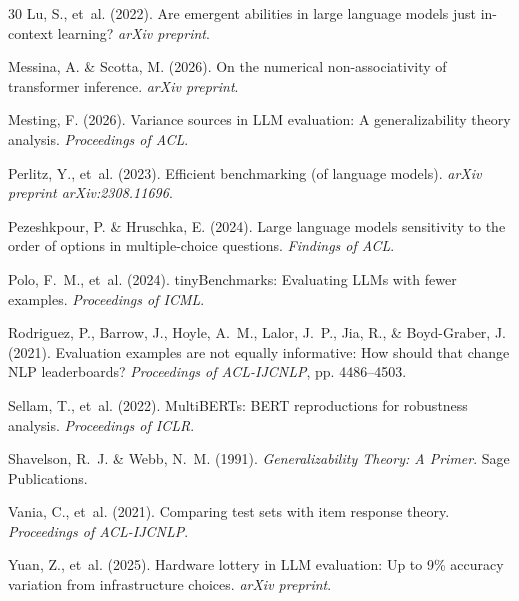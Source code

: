 \documentclass[11pt,twocolumn]{article}
\begin{document}
\begin{thebibliography}{30}
Lu, S., et~al. (2022).
\newblock Are emergent abilities in large language models just in-context learning?
\newblock \emph{arXiv preprint}.

Messina, A. \& Scotta, M. (2026).
\newblock On the numerical non-associativity of transformer inference.
\newblock \emph{arXiv preprint}.

Mesting, F. (2026).
\newblock Variance sources in LLM evaluation: A generalizability theory analysis.
\newblock \emph{Proceedings of ACL}.

Perlitz, Y., et~al. (2023).
\newblock Efficient benchmarking (of language models).
\newblock \emph{arXiv preprint arXiv:2308.11696}.

Pezeshkpour, P. \& Hruschka, E. (2024).
\newblock Large language models sensitivity to the order of options in multiple-choice questions.
\newblock \emph{Findings of ACL}.

Polo, F.~M., et~al. (2024).
\newblock tinyBenchmarks: Evaluating LLMs with fewer examples.
\newblock \emph{Proceedings of ICML}.

Rodriguez, P., Barrow, J., Hoyle, A.~M., Lalor, J.~P., Jia, R., \& Boyd-Graber, J. (2021).
\newblock Evaluation examples are not equally informative: How should that change NLP leaderboards?
\newblock \emph{Proceedings of ACL-IJCNLP}, pp. 4486--4503.

Sellam, T., et~al. (2022).
\newblock MultiBERTs: BERT reproductions for robustness analysis.
\newblock \emph{Proceedings of ICLR}.

Shavelson, R.~J. \& Webb, N.~M. (1991).
\newblock \emph{Generalizability Theory: A Primer}.
\newblock Sage Publications.

Vania, C., et~al. (2021).
\newblock Comparing test sets with item response theory.
\newblock \emph{Proceedings of ACL-IJCNLP}.

Yuan, Z., et~al. (2025).
\newblock Hardware lottery in LLM evaluation: Up to 9\% accuracy variation from infrastructure choices.
\newblock \emph{arXiv preprint}.

\end{thebibliography}
\end{document}
